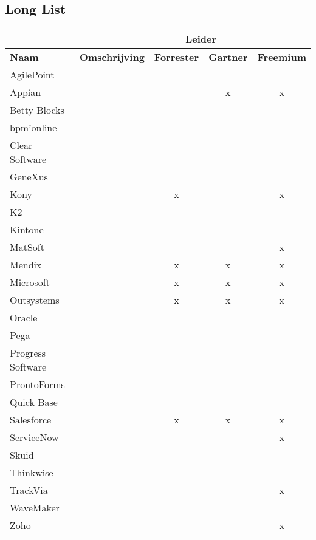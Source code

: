 \subsection{Long List}

\begin{longtable}{llccc}
    \textbf{} & \textbf{} & \multicolumn{2}{c}{\textbf{Leider}} & \multicolumn{1}{l}{\textbf{}} \\
    \endfirsthead
    \endhead
    \textbf{Naam} & \textbf{Omschrijving} & \multicolumn{1}{l}{\textbf{Forrester}} & \multicolumn{1}{l}{\textbf{Gartner}} & \multicolumn{1}{l}{\textbf{Freemium}} \\
    AgilePoint &  &  &  &  \\
    Appian &  &  & x & x \\
    Betty Blocks &  &  &  &  \\
    bpm'online &  &  &  &  \\
    Clear Software &  &  &  &  \\
    GeneXus &  &  &  &  \\
    Kony &  & x &  & x \\
    K2 &  &  &  &  \\
    Kintone &  &  &  &  \\
    MatSoft &  &  &  & x \\
    Mendix &  & x & x & x \\
    Microsoft &  & x & x & x \\
    Outsystems &  & x & x & x \\
    Oracle &  &  &  &  \\
    Pega &  &  &  &  \\
    Progress Software &  &  &  &  \\
    ProntoForms &  &  &  &  \\
    Quick Base &  &  &  &  \\
    Salesforce &  & x & x & x \\
    ServiceNow &  &  &  & x \\
    Skuid &  &  &  &  \\
    Thinkwise &  &  &  &  \\
    TrackVia &  &  &  & x \\
    WaveMaker &  &  &  &  \\
    Zoho &  &  &  & x
\end{longtable}

